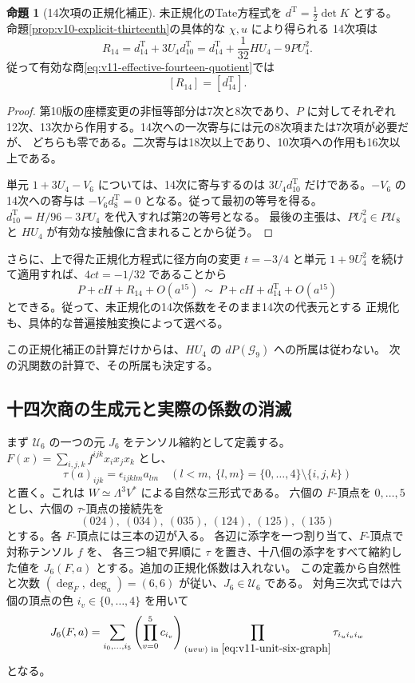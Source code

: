 \documentclass[a4paper,11pt]{ltjsarticle}
\theoremstyle{definition}
\newtheorem{proposition}[theorem]{命題}
\begin{document}
\begin{proposition}[14次項の正規化補正]
\label{prop:v11-actual-fourteen-correction}
未正規化のTate方程式を $d^{\mathrm T}=\tfrac12\det K$ とする。
命題\ref{prop:v10-explicit-thirteenth}の具体的な $\chi,u$ により得られる
14次項は
\begin{equation}\label{eq:v11-fourteen-corrected}
 R_{14}
 =d^{\mathrm T}_{14}+3U_4d^{\mathrm T}_{10}
 =d^{\mathrm T}_{14}+\frac1{32}HU_4-9PU_4^2.
\end{equation}
従って有効な商\eqref{eq:v11-effective-fourteen-quotient}では
\[
 [R_{14}]=[d^{\mathrm T}_{14}].
\]
\end{proposition}
\begin{proof}
第10版の座標変更の非恒等部分は7次と8次であり、$P$ に対してそれぞれ
12次、13次から作用する。14次への一次寄与には元の8次項または7次項が必要だが、
どちらも零である。二次寄与は18次以上であり、10次項への作用も16次以上である。

単元 $1+3U_4-V_6$ については、14次に寄与するのは
$3U_4d^{\mathrm T}_{10}$ だけである。$-V_6$ の14次への寄与は
$-V_6d^{\mathrm T}_8=0$ となる。従って最初の等号を得る。
$d^{\mathrm T}_{10}=H/96-3PU_4$ を代入すれば第2の等号となる。
最後の主張は、$PU_4^2\in P\mathcal U_8$ と
$HU_4$ が有効な接触像に含まれることから従う。
\end{proof}

さらに、上で得た正規化方程式に径方向の変更 $t=-3/4$ と単元
$1+9U_4^2$ を続けて適用すれば、$4ct=-1/32$ であることから
\[
 P+cH+R_{14}+O(a^{15})
 \ \sim\ P+cH+d^{\mathrm T}_{14}+O(a^{15})
\]
とできる。従って、未正規化の14次係数をそのまま14次の代表元とする
正規化も、具体的な普遍接触変換によって選べる。

この正規化補正の計算だけからは、$HU_4$ の $dP(\mathcal G_9)$ への所属は従わない。
次の汎関数の計算で、その所属も決定する。

\subsection{十四次商の生成元と実際の係数の消滅}\label{subsec:v11-fourteenth-complement}

まず \(\mathcal U_6\) の一つの元 \(J_6\) をテンソル縮約として定義する。
\(F(x)=\sum_{i,j,k}f^{ijk}x_ix_jx_k\) とし、
\[
 \tau(a)_{ijk}=\epsilon_{ijklm}a_{lm}\quad(l<m,
       \ \{l,m\}=\{0,\ldots,4\}\setminus\{i,j,k\})
\]
と置く。これは \(W\simeq\Lambda^3V^*\) による自然な三形式である。
六個の \(F\)-頂点を \(0,\ldots,5\) とし、六個の \(\tau\)-頂点の接続先を
\begin{equation}\label{eq:v11-unit-six-graph}
 (024),\ (034),\ (035),\ (124),\ (125),\ (135)
\end{equation}
とする。各 \(F\)-頂点には三本の辺が入る。
各辺に添字を一つ割り当て、\(F\)-頂点で対称テンソル \(f\) を、
各三つ組で昇順に \(\tau\) を置き、十八個の添字をすべて縮約した値を
\(J_6(F,a)\) とする。追加の正規化係数は入れない。
この定義から自然性と次数 \((\deg_F,\deg_a)=(6,6)\) が従い、\(J_6\in\mathcal U_6\) である。
対角三次式では六個の頂点の色 \(i_v\in\{0,\ldots,4\}\) を用いて
\[
 J_6(F,a)=\sum_{i_0,\ldots,i_5}
      \left(\prod_{v=0}^5c_{i_v}\right)
      \prod_{(uvw)\text{ in }\eqref{eq:v11-unit-six-graph}}
                   \tau_{i_ui_vi_w}
\]
となる。
\end{document}
